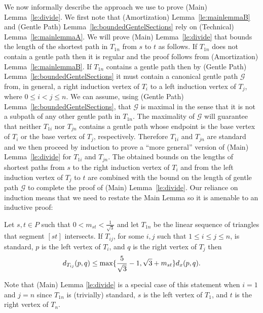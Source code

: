 We now informally describe the approach we use to prove (Main) 
Lemma~\ref{le:divide}. We first note that (Amortization) Lemma~\ref{le:mainlemmaB}
and (Gentle Path) Lemma~\ref{le:boundedGentelSections}
rely on (Technical) Lemma~\ref{le:mainlemmaA}. We will prove (Main) 
Lemma~\ref{le:divide} that
bounds the length of the shortest path in $T_{1n}$ from $s$ to $t$ as follows. 
If $T_{1n}$ does not contain a gentle path then it is regular and the proof follows
from (Amortization) Lemma~\ref{le:mainlemmaB}. If $T_{1n}$ contains a gentle path
then by (Gentle Path) Lemma~\ref{le:boundedGentelSections} it must contain a
canonical gentle path $\mathcal{G}$ from, in general, a right induction vertex of $T_i$ to
a left induction vertex of $T_j$, where $0 \leq i < j \leq n$. We can assume, 
using (Gentle Path) Lemma~\ref{le:boundedGentelSections}, that $\mathcal{G}$ is maximal in
the sense that it is not a subpath of any other gentle path in $T_{1n}$.  
The maximality of $\mathcal{G}$ will guarantee that neither $T_{1i}$ nor $T_{jn}$ contains
a gentle path whose endpoint is the base vertex of $T_i$ or the base
vertex of $T_j$, respectively. Therefore $T_{1i}$ and $T_{jn}$ are standard and
we then proceed by induction to prove a ``more general'' version of (Main)
Lemma~\ref{le:divide} for $T_{1i}$ and $T_{jn}$. The obtained bounds on the
lengths of shortest paths from $s$ to the right induction vertex of $T_i$ and 
from the left induction vertex of $T_j$ to $t$ are combined
with the bound on the length of gentle path $\mathcal{G}$ to complete the proof of (Main)
Lemma~\ref{le:divide}. Our reliance on induction means that we need to restate
the Main Lemma so it is amenable to an inductive proof:
\begin{lemma}
Let $s,t \in P$ such that $0 < m_{st} < \frac{1}{\sqrt{3}}$ and let $T_{1n}$
be the linear sequence of triangles that segment $[st]$ intersects. If
$T_{ij}$, for some $i,j$
such that $1 \leq i \leq j \leq n$, is standard, $p$ is the left vertex
of $T_i$, and $q$ is the right vertex of $T_j$ then
\[d_{T_{ij}}(p,q) \leq  \max\{\frac{5}{\sqrt{3}}-1,\sqrt{3}+m_{st}\}d_x(p,q).\]
\end{lemma}
Note that (Main) Lemma \ref{le:divide} is a special case of this
statement when $i=1$ and $j=n$ since $T_{1n}$ is (trivially) standard, 
$s$ is the left vertex of $T_1$, and $t$
is the right vertex of $T_n$.

